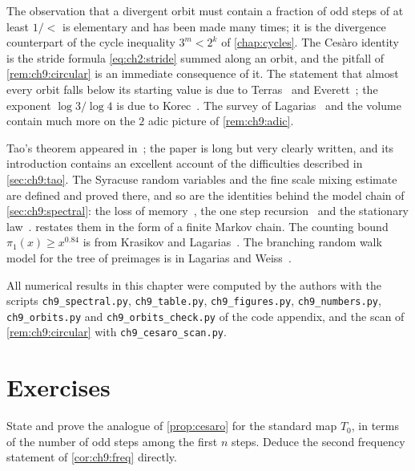 The observation that a divergent orbit must contain a fraction of odd steps of
at least $1/\lt$ is elementary and has been made many times; it is the
divergence counterpart of the cycle inequality $3^m<2^k$ of \cref{chap:cycles}.
The Ces\`aro identity is the stride formula \eqref{eq:ch2:stride} summed along an orbit, and the pitfall of \cref{rem:ch9:circular} is an immediate consequence of it. The statement that almost every orbit falls below its starting value
is due to Terras~\cite{terras1976,terras1979} and Everett~\cite{everett1977}; the
exponent $\log3/\log4$ is due to Korec~\cite{korec1994}. The survey of
Lagarias~\cite{lagarias1985} and the volume~\cite{lagarias2010} contain much
more on the $2$ adic picture of \cref{rem:ch9:adic}.

Tao's theorem appeared in~\cite{tao2022}; the paper is long but very clearly
written, and its introduction contains an excellent account of the
difficulties described in \cref{sec:ch9:tao}. The
Syracuse random variables and the fine scale mixing estimate are defined and
proved there, and so are the identities behind the model chain of \cref{sec:ch9:spectral}: the loss of memory~\cite[eq.~(1.21)]{tao2022}, the one step recursion~\cite[Lemma~1.12]{tao2022} and the stationary law~\cite[Remark~1.13]{tao2022}.  restates them in the form of a finite Markov chain. The counting bound
$\pi_1(x)\geq x^{0.84}$ is from Krasikov and Lagarias~\cite{krasikov2003}. The branching random
walk model for the tree of preimages is in Lagarias and Weiss~\cite{lagarias1992}.

\begin{sloppypar}
All numerical results in this chapter were computed by the authors with the scripts \texttt{ch9\_spectral.py}, \texttt{ch9\_table.py}, \texttt{ch9\_figures.py}, \texttt{ch9\_numbers.py}, \texttt{ch9\_orbits.py} and \texttt{ch9\_orbits\_check.py} of the code appendix, and the scan of \cref{rem:ch9:circular} with \texttt{ch9\_cesaro\_scan.py}.
\end{sloppypar}

\section*{Exercises}

\begin{exercise}\label{ex:ch9:standard}
State and prove the analogue of \cref{prop:cesaro} for the standard map $T_0$,
in terms of the number of odd steps among the first $n$ steps. Deduce the
second frequency statement of \cref{cor:ch9:freq} directly.
\end{exercise}

